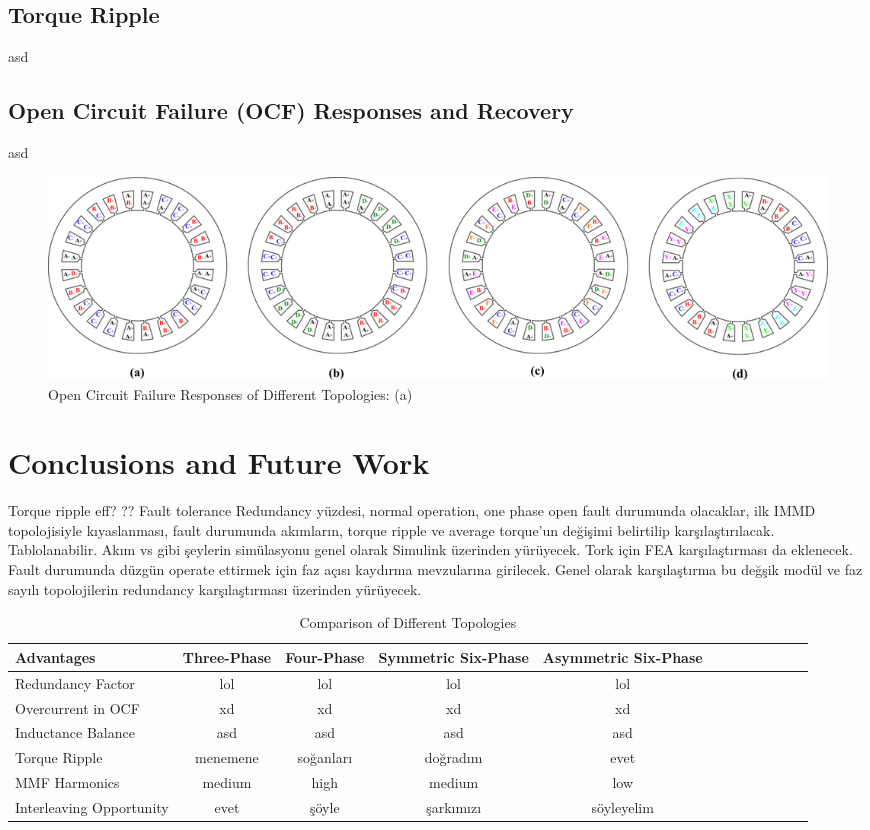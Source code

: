 \documentclass[a4paper,11pt]{article}
\begin{document}
\subsection{\normalsize\textbf{Torque Ripple}}
asd
\subsection{\normalsize\textbf{Open Circuit Failure (OCF) Responses and Recovery}}
asd
\begin{figure}[ht!]
    \centering
    \includegraphics{windings.png}
    \caption{Open Circuit Failure Responses of Different Topologies: (a)}
    \label{fig:ocfresponse}
\end{figure}

\section{\normalsize\textbf{Conclusions and Future Work}}
Torque ripple
eff?
??
Fault tolerance
Redundancy yüzdesi, normal operation, one phase open fault durumunda olacaklar, ilk IMMD topolojisiyle kıyaslanması, fault durumunda akımların, torque ripple ve average torque'un değişimi belirtilip karşılaştırılacak. Tablolanabilir. Akım vs gibi şeylerin simülasyonu genel olarak Simulink üzerinden yürüyecek. Tork için FEA karşılaştırması da eklenecek. Fault durumunda düzgün operate ettirmek için faz açısı kaydırma mevzularına girilecek. Genel olarak karşılaştırma bu değşik modül ve faz sayılı topolojilerin redundancy karşılaştırması üzerinden yürüyecek. 

\begin{table}[ht!]
 \caption{Comparison of Different Topologies}
\label{kd}
\begin{tabularx}{\textwidth}{@{}l*{10}{C}c@{}}
\toprule
Advantages      & Three-Phase  & Four-Phase & Symmetric Six-Phase & Asymmetric Six-Phase \\ 
\midrule
Redundancy Factor    & lol    & lol    & lol   & lol \\ 
Overcurrent in OCF   & xd      & xd  & xd    & xd \\ 
Inductance Balance  &  asd &   asd&    asd&  asd\\
Torque Ripple  & menemene  & soğanları   & doğradım   & evet  \\
MMF Harmonics  & medium    & high  & medium  & low  \\ 
Interleaving Opportunity  & evet  & şöyle   & şarkımızı   & söyleyelim  \\


\bottomrule
\end{tabularx}
\end{table}

\AtNextBibliography{\tiny}
\printbibliography
\end{document}
